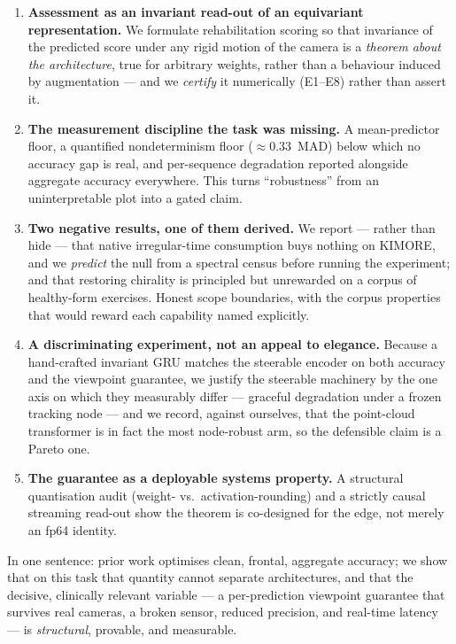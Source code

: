 \documentclass[11pt]{article}
\begin{document}
\begin{enumerate}[leftmargin=1.4em]
\item \textbf{Assessment as an invariant read-out of an equivariant representation.}
We formulate rehabilitation scoring so that invariance of the predicted score under
any rigid motion of the camera is a \emph{theorem about the architecture}, true for
arbitrary weights, rather than a behaviour induced by augmentation --- and we
\emph{certify} it numerically (E1--E8) rather than assert it.

\item \textbf{The measurement discipline the task was missing.} A mean-predictor
floor, a quantified nondeterminism floor ($\approx0.33$~MAD) below which no accuracy
gap is real, and per-sequence degradation reported alongside aggregate accuracy
everywhere. This turns ``robustness'' from an uninterpretable plot into a gated
claim.

\item \textbf{Two negative results, one of them derived.} We report --- rather than
hide --- that native irregular-time consumption buys nothing on KIMORE, and we
\emph{predict} the null from a spectral census before running the experiment; and
that restoring chirality is principled but unrewarded on a corpus of healthy-form
exercises. Honest scope boundaries, with the corpus properties that would reward
each capability named explicitly.

\item \textbf{A discriminating experiment, not an appeal to elegance.} Because a
hand-crafted invariant GRU matches the steerable encoder on both accuracy and the
viewpoint guarantee, we justify the steerable machinery by the one axis on which
they measurably differ --- graceful degradation under a frozen tracking node ---
and we record, against ourselves, that the point-cloud transformer is in fact the
most node-robust arm, so the defensible claim is a Pareto one.

\item \textbf{The guarantee as a deployable systems property.} A structural
quantisation audit (weight- vs.\ activation-rounding) and a strictly causal
streaming read-out show the theorem is co-designed for the edge, not merely an
fp64 identity.
\end{enumerate}

\noindent In one sentence: prior work optimises clean, frontal, aggregate accuracy;
we show that on this task that quantity cannot separate architectures, and that the
decisive, clinically relevant variable --- a per-prediction viewpoint guarantee that
survives real cameras, a broken sensor, reduced precision, and real-time latency ---
is \emph{structural}, provable, and measurable.
\end{document}
